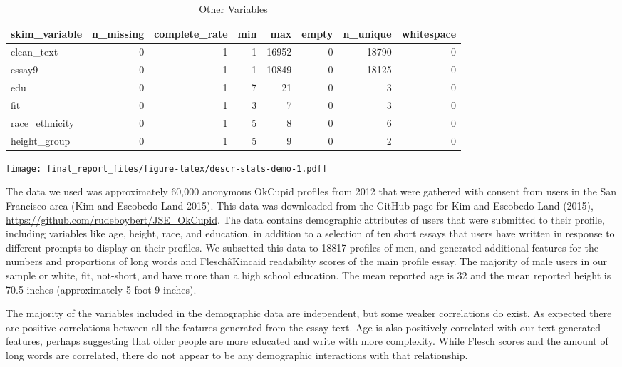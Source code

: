 \documentclass[]{article}
\begin{document}
\begin{table}

\caption{\label{tab:descr-stats-demo}Other Variables}
\centering
\begin{tabular}[t]{l|r|r|r|r|r|r|r}
\hline
skim\_variable & n\_missing & complete\_rate & min & max & empty & n\_unique & whitespace\\
\hline
clean\_text & 0 & 1 & 1 & 16952 & 0 & 18790 & 0\\
\hline
essay9 & 0 & 1 & 1 & 10849 & 0 & 18125 & 0\\
\hline
edu & 0 & 1 & 7 & 21 & 0 & 3 & 0\\
\hline
fit & 0 & 1 & 3 & 7 & 0 & 3 & 0\\
\hline
race\_ethnicity & 0 & 1 & 5 & 8 & 0 & 6 & 0\\
\hline
height\_group & 0 & 1 & 5 & 9 & 0 & 2 & 0\\
\hline
\end{tabular}
\end{table}

\texttt{[image: final\_report\_files/figure-latex/descr-stats-demo-1.pdf]}

The data we used was approximately 60,000 anonymous OkCupid profiles
from 2012 that were gathered with consent from users in the San
Francisco area (Kim and Escobedo-Land 2015). This data was downloaded
from the GitHub page for Kim and Escobedo-Land (2015),
\url{https://github.com/rudeboybert/JSE_OkCupid}. The data contains
demographic attributes of users that were submitted to their profile,
including variables like age, height, race, and education, in addition
to a selection of ten short essays that users have written in response
to different prompts to display on their profiles. We subsetted this
data to 18817 profiles of men, and generated additional features for the
numbers and proportions of long words and FleschâKincaid readability
scores of the main profile essay. The majority of male users in our
sample or white, fit, not-short, and have more than a high school
education. The mean reported age is 32 and the mean reported height is
70.5 inches (approximately 5 foot 9 inches).

The majority of the variables included in the demographic data are
independent, but some weaker correlations do exist. As expected there
are positive correlations between all the features generated from the
essay text. Age is also positively correlated with our text-generated
features, perhaps suggesting that older people are more educated and
write with more complexity. While Flesch scores and the amount of long
words are correlated, there do not appear to be any demographic
interactions with that relationship.
\end{document}
